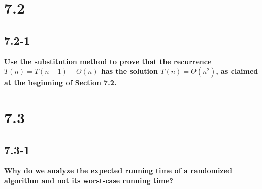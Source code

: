 \documentclass[11pt]{article}
\begin{document}
 \section*{7.2}

 \subsection*{7.2-1}
 \textbf{Use the substitution method to prove that the recurrence $T(n) = T(n-1) + \Theta (n)$ has the
 solution $T(n) = \Theta (n^2)$, as claimed at the beginning of Section 7.2.}

 \section*{7.3}

 \subsection*{7.3-1}
 \textbf{Why do we analyze the expected running time of a randomized algorithm and not its worst-case 
 running time?}
\end{document}

